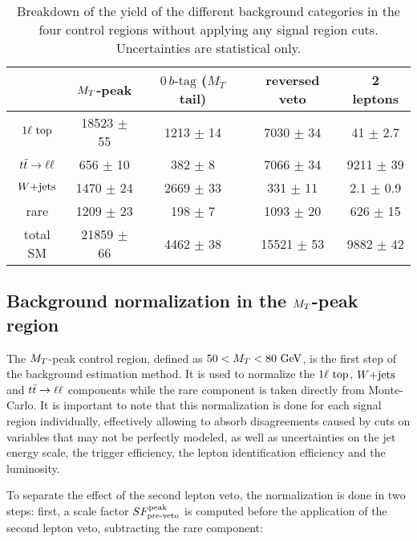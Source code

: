 \begin{table}[h!]
    \centering
\begin{tabular}{|c|cccc|}
    \hline
                     & $M_T$-peak       & $0\, b\text{-tag}$ ($M_T$ tail) & reversed veto    & 2 leptons             \\
    \hline
     $1\ell~\text{top}$ & 18523 $\pm$ 55   &  1213 $\pm$ 14        &  7030 $\pm$ 34   &   41 $\pm$ 2.7  \\
     $t\bar{t} \rightarrow \ell \ell$  &   656 $\pm$ 10   &   382 $\pm$ 8         &  7066 $\pm$ 34   & 9211 $\pm$ 39   \\
     $\text{$W$+jets}$        &  1470 $\pm$ 24   &  2669 $\pm$ 33        &   331 $\pm$ 11   &  2.1 $\pm$ 0.9  \\
     rare            &  1209 $\pm$ 23   &   198 $\pm$ 7         &  1093 $\pm$ 20   &  626 $\pm$ 15   \\
    \hline
     total SM        & 21859 $\pm$ 66   &  4462 $\pm$ 38        & 15521 $\pm$ 53   & 9882 $\pm$ 42   \\
    \hline
\end{tabular}
    \caption{Breakdown of the yield of the different background categories in the four
    control regions without applying any signal region cuts. Uncertainties are statistical only.}
    \label{tab:cutflowControlRegions}
\end{table}

        \subsection{Background normalization in the $M_T$-peak region \label{sec:MTpeakNormalization}}

    The $M_T$-peak control region, defined as $50 < M_T < 80 ~\text{GeV}$, is the first step of the
    background estimation method. It is used to normalize the $1\ell~\text{top}$, $\text{$W$+jets}$ and
    $t\bar{t} \rightarrow \ell \ell$ components while the rare component is taken directly from Monte-Carlo.
    It is important to note that this normalization is done for each signal region individually,
    effectively allowing to absorb disagreements caused by cuts on variables that may not
    be perfectly modeled, as well as uncertainties on the jet energy scale, the trigger efficiency,
    the lepton identification efficiency and the luminosity.

    To separate the effect of the second lepton veto, the  normalization is done in two
    steps: first, a scale factor $SF_{\text{pre-veto}}^{\text{peak}}$ is computed before the application of the
    second lepton veto, subtracting the rare component:

